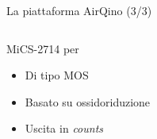 \begin{frame}[t]{La piattaforma AirQino (3/3)}
\begin{columns}

\begin{column}{0.5\textwidth}
\begin{center}

\begin{block}{MiCS-2714 per }
\begin{figure}[H]
    \centering
\end{figure}
\vspace{0.1cm}
\begin{itemize}
  \item Di tipo MOS
  \item Basato su ossidoriduzione
  \item Uscita in \textit{counts}
\end{itemize}
\vspace{0.2cm}

\end{block}

\end{center}
\end{column}


\end{columns}
\end{frame}
